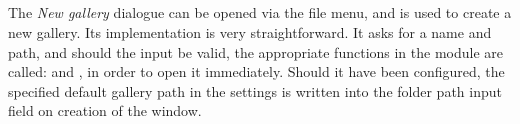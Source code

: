 \subsection{}
\def\kapitelautor{Erik Ritschl}

The \emph{New gallery} dialogue can be opened via the file menu, and is used to create a new gallery. Its implementation is very straightforward. It asks for a name and path, and should the input be valid, the appropriate functions in the  module are called:  and , in order to open it immediately. Should it have been configured, the specified default gallery path in the settings is written into the folder path input field on creation of the window.